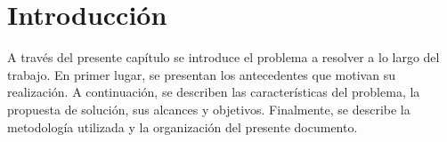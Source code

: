 
\chapter{Introducción}
\label{ch:introduccion}
\setcounter{page}{1}
A través del presente capítulo se introduce el problema a resolver a lo largo del trabajo. En primer lugar, se presentan los antecedentes que motivan su realización. A continuación, se describen las características del problema, la propuesta de solución, sus alcances y objetivos. Finalmente, se describe la metodología utilizada y la organización del presente documento.










